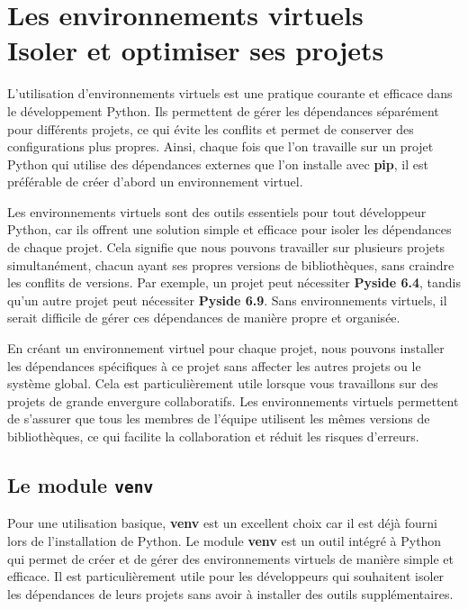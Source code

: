 \chapter[Les environnements virtuels]{Les environnements virtuels \\ Isoler et optimiser ses projets}

\bigskip

L'utilisation d'environnements virtuels est une pratique courante et efficace dans le développement Python. Ils permettent de gérer les dépendances séparément pour différents projets, ce qui évite les conflits et permet de conserver des configurations plus propres. Ainsi, chaque fois que l'on travaille sur un projet Python qui utilise des dépendances externes que l'on installe avec \textbf{pip}, il est préférable de créer d'abord un environnement virtuel.

Les environnements virtuels sont des outils essentiels pour tout développeur Python, car ils offrent une solution simple et efficace pour isoler les dépendances de chaque projet. Cela signifie que nous pouvons travailler sur plusieurs projets simultanément, chacun ayant ses propres versions de bibliothèques, sans craindre les conflits de versions. Par exemple, un projet peut nécessiter \textbf{Pyside 6.4}, tandis qu'un autre projet peut nécessiter \textbf{Pyside 6.9}. Sans environnements virtuels, il serait difficile de gérer ces dépendances de manière propre et organisée.

En créant un environnement virtuel pour chaque projet, nous pouvons installer les dépendances spécifiques à ce projet sans affecter les autres projets ou le système global. Cela est particulièrement utile lorsque vous travaillons sur des projets de grande envergure collaboratifs. Les environnements virtuels permettent de s'assurer que tous les membres de l'équipe utilisent les mêmes versions de bibliothèques, ce qui facilite la collaboration et réduit les risques d'erreurs.

\section{Le module \texttt{venv}}
Pour une utilisation basique, \textbf{venv} est un excellent choix car il est déjà fourni lors de l'installation de Python. Le module \textbf{venv} est un outil intégré à Python qui permet de créer et de gérer des environnements virtuels de manière simple et efficace. Il est particulièrement utile pour les développeurs qui souhaitent isoler les dépendances de leurs projets sans avoir à installer des outils supplémentaires.

